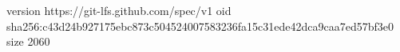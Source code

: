 version https://git-lfs.github.com/spec/v1
oid sha256:c43d24b927175ebc873c504524007583236fa15c31ede42dca9caa7ed57bf3e0
size 2060
